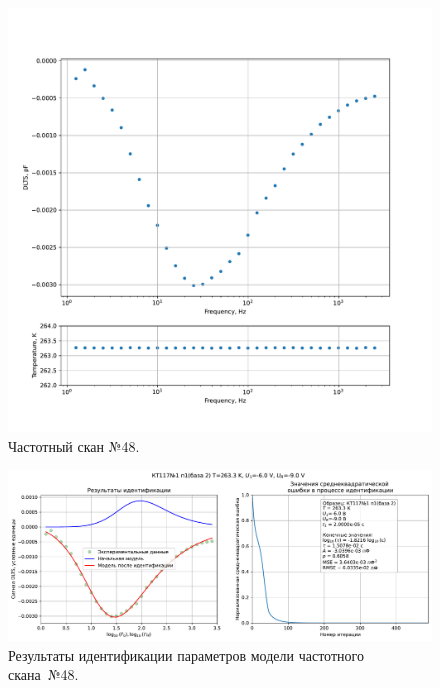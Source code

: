 \begin{figure}[!ht]
    \centering
    \includegraphics[width=1\textwidth]{../plots/КТ117№1_п1(база 2)_2500Гц-1Гц_1пФ_-10С_-6В-9В_50мВ_20мкс_шаг_0,1.pdf}
    \caption{Частотный скан №48.}
    \label{pic:frequency_scan_48}
\end{figure}

\begin{figure}[!ht]
    \centering
    \includegraphics[width=1\textwidth]{../plots/КТ117№1_п1(база 2)_2500Гц-1Гц_1пФ_-10С_-6В-9В_50мВ_20мкс_шаг_0,1_model.pdf}
    \caption{Результаты идентификации параметров модели частотного скана~№48.}
    \label{pic:frequency_scan_model48}
\end{figure}

\pagebreak


